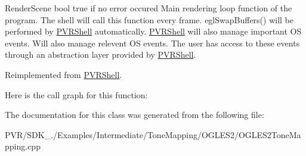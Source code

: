   Render\+Scene  bool true if no error occured  Main rendering loop function of the program. The shell will call this function every frame. egl\+Swap\+Buffers() will be performed by \hyperlink{class_p_v_r_shell}{P\+V\+R\+Shell} automatically. \hyperlink{class_p_v_r_shell}{P\+V\+R\+Shell} will also manage important O\+S events. Will also manage relevent O\+S events. The user has access to these events through an abstraction layer provided by \hyperlink{class_p_v_r_shell}{P\+V\+R\+Shell}. 

Reimplemented from \hyperlink{class_p_v_r_shell_ae0eb5f797cbe993a22b8659f9c332578}{P\+V\+R\+Shell}.



Here is the call graph for this function\+:




The documentation for this class was generated from the following file\+:\begin{DoxyCompactItemize}
\item 
P\+V\+R/\+S\+D\+K\+\_./\+Examples/\+Intermediate/\+Tone\+Mapping/\+O\+G\+L\+E\+S2/O\+G\+L\+E\+S2\+Tone\+Mapping.\+cpp\end{DoxyCompactItemize}
